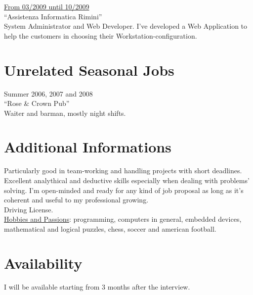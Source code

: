 \documentclass[margin]{res}
\begin{document}
\begin{resume}
\vspace{2mm}


\underline{From 03/2009 until 10/2009} \\
``Assistenza Informatica Rimini'' \\
System Administrator and Web Developer. I've developed a Web Application to help the customers
in choosing their Workstation-configuration.

\section{Unrelated Seasonal Jobs}
Summer 2006, 2007 and 2008 \\
``Rose \& Crown Pub'' \\
Waiter and barman, mostly night shifts.

\section{Additional Informations}
Particularly good in team-working and handling projects with short deadlines. Excellent
analythical and deductive skills especially when dealing with problems' solving. I'm open-minded
and ready for any kind of job proposal as long as it's coherent and useful to my professional growing. \\
Driving License. \\
\underline{Hobbies and Passions}: programming, computers in general, embedded devices, mathematical and
logical puzzles, chess, soccer and american football.

\section{Availability}
I will be available starting from 3 months after the interview.

\end{resume} 
\end{document}
